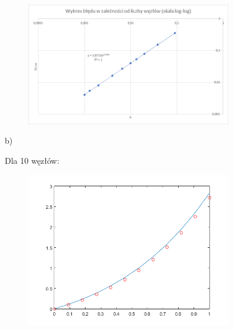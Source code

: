 \begin{samepage}
	
	\begin{figure}[!ht]
		\begin{center}
			\includegraphics[width=0.8\textwidth]{Lab4/charts/zad4/1/error.png}
		\end{center}
	\end{figure}
	\FloatBarrier
\end{samepage} 

\newpage

b)\\
\begin{samepage}
	Dla 10 węzłów:
	
	
	
	\FloatBarrier
	\begin{figure}[!ht]
		\begin{center}
			\includegraphics[width=0.8\textwidth]{Lab4/charts/zad4/2/10.png}
		\end{center}
	\end{figure}
	\FloatBarrier
\end{samepage}


